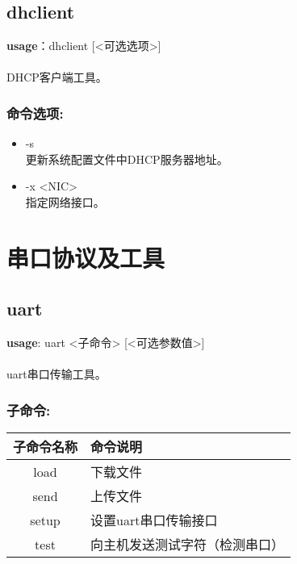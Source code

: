 \subsection{dhclient}
\textbf{usage}：dhclient [<可选选项>] \\
\\ DHCP客户端工具。

\subsubsection{命令选项:}
\begin{itemize}
	\item -s \\
	更新系统配置文件中DHCP服务器地址。
	\item -x <NIC> \\
	指定网络接口。
\end{itemize}

\section{串口协议及工具}
\subsection{uart}
\textbf{usage}: uart <子命令> [<可选参数值>] \\
\\ uart串口传输工具。

\subsubsection{子命令:}
\begin{table}[H]
\setlength{\parindent}{0pt}
\begin{tabular}{|c|l|} \hline
子命令名称 & 命令说明 \\ \hline
load & 下载文件\\ \hline
send & 上传文件 \\ \hline
setup & 设置uart串口传输接口\\ \hline
test & 向主机发送测试字符（检测串口） \\ \hline
\end{tabular}
\end{table}

